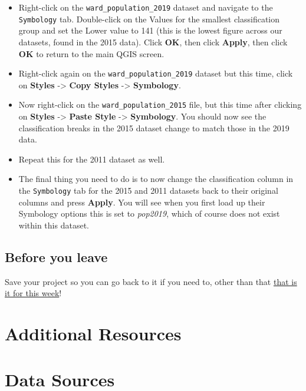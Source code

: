\documentclass[
]{book}
\providecommand{\tightlist}{%
  \setlength{\itemsep}{0pt}\setlength{\parskip}{0pt}}
\begin{document}
\begin{itemize}
\tightlist
\item
  Right-click on the \texttt{ward\_population\_2019} dataset and navigate to the \texttt{Symbology} tab. Double-click on the Values for the smallest classification group and set the Lower value to 141 (this is the lowest figure across our datasets, found in the 2015 data). Click \textbf{OK}, then click \textbf{Apply}, then click \textbf{OK} to return to the main QGIS screen.
\item
  Right-click again on the \texttt{ward\_population\_2019} dataset but this time, click on \textbf{Styles} -\textgreater{} \textbf{Copy Styles} -\textgreater{} \textbf{Symbology}.
\item
  Now right-click on the \texttt{ward\_population\_2015} file, but this time after clicking on \textbf{Styles} -\textgreater{} \textbf{Paste Style} -\textgreater{} \textbf{Symbology}. You should now see the classification breaks in the 2015 dataset change to match those in the 2019 data.
\item
  Repeat this for the 2011 dataset as well.
\item
  The final thing you need to do is to now change the classification column in the \texttt{Symbology} tab for the 2015 and 2011 datasets back to their original columns and press \textbf{Apply}. You will see when you first load up their Symbology options this is set to \emph{pop2019}, which of course does not exist within this dataset.
\end{itemize}

\hypertarget{byl-w02}{%
\section{Before you leave}\label{byl-w02}}

Save your project so you can go back to it if you need to, other than that \href{https://www.youtube.com/watch?v=Wmc8bQoL-J0}{that is it for this week}!

\hypertarget{additional-resources}{%
\chapter*{Additional Resources}\label{additional-resources}}

\hypertarget{data-sources}{%
\chapter{Data Sources}\label{data-sources}}
\end{document}

